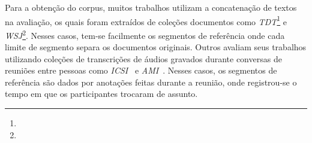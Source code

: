 
Para a obtenção do corpus, muitos trabalhos utilizam a concatenação de textos na avaliação, os quais foram extraídos de coleções documentos como 
\textit{TDT}\footnote{\urltdt} e
\textit{WSJ}\footnote{\urlwsj}.
Nesses casos, tem-se facilmente os segmentos de referência onde cada limite de segmento separa os documentos originais.
%
%
Outros avaliam seus trabalhos utilizando coleções de transcrições de áudios gravados durante conversas de reuniões entre pessoas como \textit{ICSI}~\cite{Janin2003} e \textit{AMI}~\cite{Carletta2005}.
Nesses casos, os segmentos de referência são dados por anotações feitas durante a reunião, onde registrou-se o tempo em que os participantes trocaram de assunto.

















%
%
%		
%
%
%
%

%





